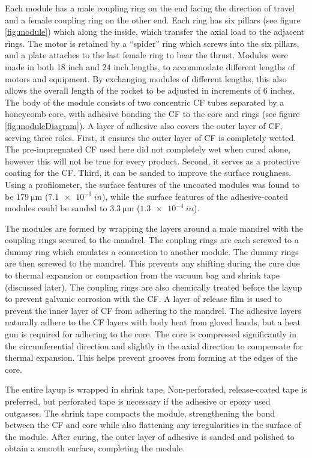 \documentclass{aiaa-tc}%
\begin{document}
Each module has a male coupling ring on the end facing the direction of travel and a female coupling ring on the other end. 
Each ring has six pillars (see figure \ref{fig:module}) which along the inside, which transfer the axial load to the adjacent rings.
The motor is retained by a ``spider'' ring which screws into the six pillars, and a plate attaches to the last female ring to bear the thrust.
Modules were made in both 18 inch and 24 inch lengths, to accommodate different lengths of motors and equipment. 
By exchanging modules of different lengths, this also allows the overall length of the rocket to be adjusted in increments of 6 inches.
The body of the module consists of two concentric CF tubes separated by a honeycomb core, with adhesive bonding the CF to the core and rings (see figure \ref{fig:moduleDiagram}). 
A layer of adhesive also covers the outer layer of CF, serving three roles. First, it ensures the outer layer of CF is completely wetted. 
The pre-impregnated CF used here did not completely wet when cured alone, however this will not be true for every product.
Second, it serves as a protective coating for the CF. 
Third, it can be sanded to improve the surface roughness.
Using a profilometer, the surface features of the uncoated modules was found to be $\SI{179}{\micro\meter}$ ($\SI{7.1e-3}{in}$), while the surface features of the adhesive-coated modules could be sanded to $\SI{3.3}{\micro\meter}$ ($\SI{1.3e-4}{in}$).

The modules are formed by wrapping the layers around a male mandrel with the coupling rings secured to the mandrel.
The coupling rings are each screwed to a dummy ring which emulates a connection to another module. The dummy rings are then screwed to the mandrel.
This prevents any shifting during the cure due to thermal expansion or compaction from the vacuum bag and shrink tape (discussed later).
The coupling rings are also chemically treated before the layup to prevent galvanic corrosion with the CF.
A layer of release film is used to prevent the inner layer of CF from adhering to the mandrel. 
The adhesive layers naturally adhere to the CF layers with body heat from gloved hands, but a heat gun is required for adhering to the core. 
The core is compressed significantly in the circumferential direction and slightly in the axial direction to compensate for thermal expansion. This helps prevent grooves from forming at the edges of the core.

The entire layup is wrapped in shrink tape. Non-perforated, release-coated tape is preferred, but perforated tape is necessary if the adhesive or epoxy used outgasses.
The shrink tape compacts the module, strengthening the bond between the CF and core while also flattening any irregularities in the surface of the module. 
After curing, the outer layer of adhesive is sanded and polished to obtain a smooth surface, completing the module. 
\end{document}
